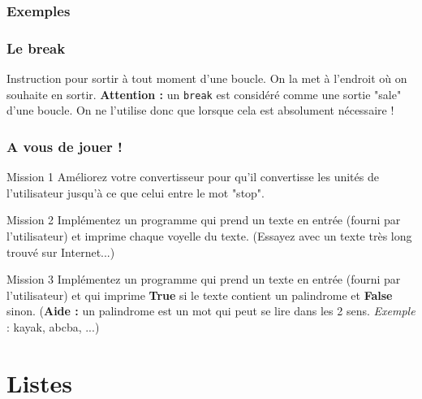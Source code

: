 \documentclass[handout]{beamer}
\begin{document}
\begin{frame}
\frametitle{Exemples}
\forloop
\forloopsecundo
\end{frame}
\begin{frame}
\frametitle{Le break}
Instruction pour sortir à tout moment d'une boucle. On la met à l'endroit où on souhaite en sortir.
\break
\textbf{Attention : } un \texttt{break} est considéré comme une sortie "sale" d'une boucle. On ne l'utilise donc que lorsque cela est absolument nécessaire !
\end{frame}

\begin{frame}
\frametitle{A vous de jouer !}
         \begin{block}{Mission 1}
        Améliorez votre convertisseur pour qu'il convertisse les unités de l'utilisateur jusqu'à ce que celui entre le mot "stop".  
        \end{block}
         \begin{block}{Mission 2} 
        Implémentez un programme qui prend un texte en entrée (fourni par l'utilisateur) et imprime chaque voyelle du texte. (Essayez avec un texte très long trouvé sur Internet...)
        \end{block}
         \begin{block}{Mission 3} Implémentez un programme qui prend un texte en entrée (fourni par l'utilisateur) et qui imprime \textbf{True} si le texte contient un palindrome et \textbf{False} sinon. (\textbf{Aide :} un palindrome est un mot qui peut se lire dans les 2 sens. \textit{Exemple} : kayak, abcba, ...)  \end{block}
\end{frame}


\section{Listes}
\end{document}
